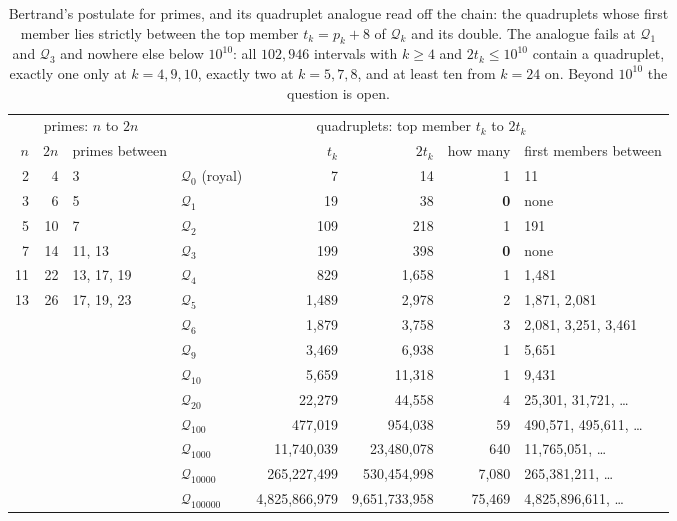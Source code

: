\documentclass[11pt,a4paper]{article}
\newcommand{\Q}{\mathcal{Q}}
\begin{document}
\begin{table}[h]
\centering
\footnotesize\setlength{\tabcolsep}{4.5pt}
\begin{tabular}{rrl@{\quad}lrrrl}
\toprule
\multicolumn{3}{c}{primes: $n$ to $2n$} & \multicolumn{5}{c}{quadruplets: top member $t_k$ to $2t_k$} \\
\cmidrule(r){1-3}\cmidrule(l){4-8}
$n$ & $2n$ & primes between & & $t_k$ & $2t_k$ & how many & first members between \\
\midrule
 2 &  4 & 3          & $\Q_0$ (royal) & 7 & 14 & 1 & 11 \\
 3 &  6 & 5          & $\Q_1$ & 19 & 38 & \textbf{0} & none \\
 5 & 10 & 7          & $\Q_2$ & 109 & 218 & 1 & 191 \\
 7 & 14 & 11, 13     & $\Q_3$ & 199 & 398 & \textbf{0} & none \\
11 & 22 & 13, 17, 19 & $\Q_4$ & 829 & 1{,}658 & 1 & 1{,}481 \\
13 & 26 & 17, 19, 23 & $\Q_5$ & 1{,}489 & 2{,}978 & 2 & 1{,}871, 2{,}081 \\
   &    &            & $\Q_6$ & 1{,}879 & 3{,}758 & 3 & 2{,}081, 3{,}251, 3{,}461 \\
   &    &            & $\Q_{9}$ & 3{,}469 & 6{,}938 & 1 & 5{,}651 \\
   &    &            & $\Q_{10}$ & 5{,}659 & 11{,}318 & 1 & 9{,}431 \\
   &    &            & $\Q_{20}$ & 22{,}279 & 44{,}558 & 4 & 25{,}301, 31{,}721, \dots \\
   &    &            & $\Q_{100}$ & 477{,}019 & 954{,}038 & 59 & 490{,}571, 495{,}611, \dots \\
   &    &            & $\Q_{1000}$ & 11{,}740{,}039 & 23{,}480{,}078 & 640 & 11{,}765{,}051, \dots \\
   &    &            & $\Q_{10000}$ & 265{,}227{,}499 & 530{,}454{,}998 & 7{,}080 & 265{,}381{,}211, \dots \\
   &    &            & $\Q_{100000}$ & 4{,}825{,}866{,}979 & 9{,}651{,}733{,}958 & 75{,}469 & 4{,}825{,}896{,}611, \dots \\
\bottomrule
\end{tabular}
\caption{Bertrand's postulate for primes, and its quadruplet analogue read
off the chain: the quadruplets whose first member lies strictly between
the top member $t_k=p_k+8$ of $\Q_k$ and its double. The analogue fails
at $\Q_1$ and $\Q_3$ and nowhere else below $10^{10}$: all $102{,}946$
intervals with $k\ge4$ and $2t_k\le10^{10}$ contain a quadruplet, exactly
one only at $k=4,9,10$, exactly two at $k=5,7,8$, and at least ten from
$k=24$ on. Beyond $10^{10}$ the question is open.}
\label{tab:bertrand}
\end{table}
\end{document}
